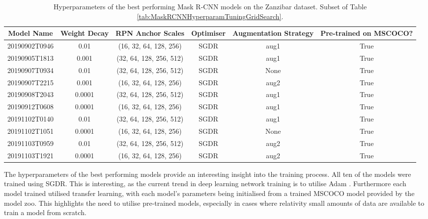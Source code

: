 \begin{table}[!ht]
	\tiny
	\begin{adjustbox}{width=\columnwidth, center}
		\begin{tabular}{cccccc}
			\toprule
			Model Name & Weight Decay &        RPN Anchor Scales & Optimiser & Augmentation Strategy & Pre-trained on MSCOCO? \\
			\midrule
				20190902T0946 &         0.01 &   (16, 32, 64, 128, 256) &      SGDR &                  aug1 &                  True \\
				20190905T1813 &        0.001 &  (32, 64, 128, 256, 512) &      SGDR &                  aug1 &                  True \\
				20190907T0934 &         0.01 &  (32, 64, 128, 256, 512) &      SGDR &                  None &                  True \\
				20190907T2215 &        0.001 &   (16, 32, 64, 128, 256) &      SGDR &                  aug2 &                  True \\
				20190908T2043 &       0.0001 &  (32, 64, 128, 256, 512) &      SGDR &                  aug1 &                  True \\
				20190912T0608 &       0.0001 &   (16, 32, 64, 128, 256) &      SGDR &                  aug1 &                  True \\
				20191102T0140 &         0.01 &  (32, 64, 128, 256, 512) &      SGDR &                  aug1 &                  True \\
				20191102T1051 &       0.0001 &   (16, 32, 64, 128, 256) &      SGDR &                  None &                  True \\
				20191103T0959 &         0.01 &  (32, 64, 128, 256, 512) &      SGDR &                  aug2 &                  True \\
				20191103T1921 &       0.0001 &   (16, 32, 64, 128, 256) &      SGDR &                  aug2 &                  True \\
			\bottomrule
		\end{tabular}
	\end{adjustbox}
	\caption[Hyperparameters of the best performing Mask R-CNN models on the Zanzibar dataset.]{Hyperparameters of the best performing Mask R-CNN models on the Zanzibar dataset. Subset of Table \ref{tab:MaskRCNNHyperparamTuningGridSearch}.}
	\label{tab:best-mask-rcnn-models}
\end{table}

The hyperparameters of the best performing models provide an interesting insight into the training process. All ten of the models were trained using SGDR. This is interesting, as the current trend in deep learning network training is to utilise Adam \cite{karpathy_peek_2017}. Furthermore each model trained utilised transfer learning, with each model's parameters being initialised from a trained MSCOCO model provided by the model zoo. This highlights the need to utilise pre-trained models, especially in cases where relativity small amounts of data are available to train a model from scratch. 

